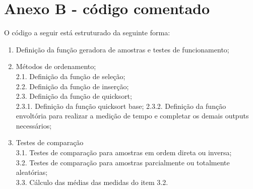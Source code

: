 \documentclass[
]{article}
\providecommand{\tightlist}{%
  \setlength{\itemsep}{0pt}\setlength{\parskip}{0pt}}
\begin{document}
\newpage

\hypertarget{anexo-b---cuxf3digo-comentado}{%
\section*{Anexo B - código
comentado}\label{anexo-b---cuxf3digo-comentado}}

O código a seguir está estruturado da seguinte forma:

\begin{enumerate}
\def\labelenumi{\arabic{enumi}.}
\tightlist
\item
  Definição da função geradora de amostras e testes de funcionamento;\\
\item
  Métodos de ordenamento;\\
  2.1. Definição da função de seleção;\\
  2.2. Definição da função de inserção;\\
  2.3. Definição da função de quicksort;\\
  2.3.1. Definição da função quicksort base; 2.3.2. Definição da função
  envoltória para realizar a medição de tempo e completar os demais
  outputs necessários;
\item
  Testes de comparação\\
  3.1. Testes de comparação para amostras em ordem direta ou inversa;\\
  3.2. Testes de comparação para amostras parcialmente ou totalmente
  aleatórias;\\
  3.3. Cálculo das médias das medidas do item 3.2.
\end{enumerate}
\end{document}
